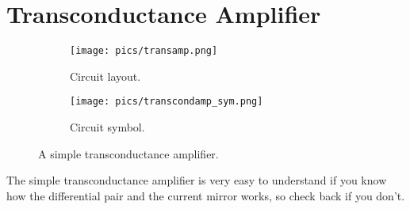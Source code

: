 \documentclass[main]{subfiles}
\begin{document}

\section{Transconductance Amplifier}
\begin{figure}[b]
\begin{subfigure} [b]{0.45\textwidth}
  \centering
  \texttt{[image: pics/transamp.png]}
  \caption{Circuit layout. \cite{lec4}}
  \label{fig:transamp}
\end{subfigure}
	\begin{subfigure} [b]{0.45\textwidth}
	\centering
	\texttt{[image: pics/transcondamp\_sym.png]}
	\caption{Circuit symbol. \cite{lec5}}
	\label{fig:transamp_sym}
	\end{subfigure}
	\label{fig:transamp_all}
	\caption{A simple transconductance amplifier.}
\end{figure}\bigskip

The simple transconductance amplifier is very easy to understand if you know how the differential pair and the current mirror works, so check back if you don't. 
\end{document}
